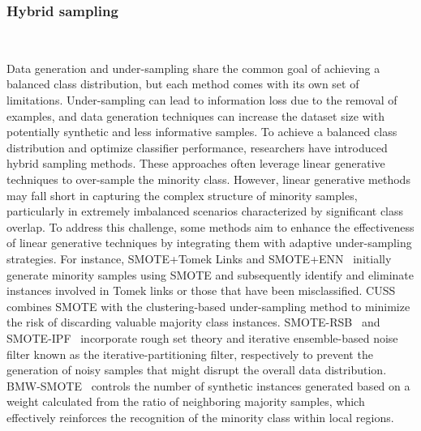 \subsubsection{Hybrid sampling}\
\label{s313}

Data generation and under-sampling share the common goal of achieving a balanced class distribution, but each method comes with its own set of limitations. Under-sampling can lead to information loss due to the removal of examples, and data generation techniques can increase the dataset size with potentially synthetic and less informative samples. To achieve a balanced class distribution and optimize classifier performance, researchers have introduced hybrid sampling methods. These approaches often leverage linear generative techniques to over-sample the minority class. However, linear generative methods may fall short in capturing the complex structure of minority samples, particularly in extremely imbalanced scenarios characterized by significant class overlap. To address this challenge, some methods aim to enhance the effectiveness of linear generative techniques by integrating them with adaptive under-sampling strategies. 
For instance, SMOTE+Tomek Links and SMOTE+ENN~\cite{batista2004study} initially generate minority samples using SMOTE and subsequently identify and eliminate instances involved in Tomek links or those that have been misclassified.
CUSS~\cite{feng2020cluster} combines SMOTE with the clustering-based under-sampling method to minimize the risk of discarding valuable majority class instances.
SMOTE-RSB~\cite{ramentol2012smote} and SMOTE-IPF~\cite{saez2015smote} incorporate rough set theory and iterative ensemble-based noise filter known as the iterative-partitioning filter, respectively to prevent the generation of noisy samples that might disrupt the overall data distribution.
BMW-SMOTE~\cite{gao2020ensemble} controls the number of synthetic instances generated based on a weight calculated from the ratio of neighboring majority samples, which effectively reinforces the recognition of the minority class within local regions.

